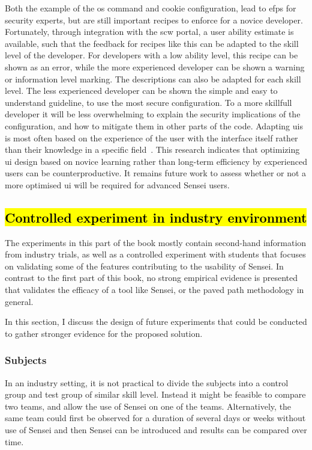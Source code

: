 Both the example of the \gls{os} command and cookie configuration, lead to \glspl{efp} for security experts, but are still important recipes to enforce for a novice developer.
Fortunately, through integration with the \gls{scw} portal, a user ability estimate is available, such that the feedback for recipes like this can be adapted to the skill level of the developer.
For developers with a low ability level, this recipe can be shown as an error, while the more experienced developer can be shown a warning or information level marking.
The descriptions can also be adapted for each skill level.
The less experienced developer can be shown the simple and easy to understand guideline, to use the most secure configuration.
To a more skillfull developer it will be less overwhelming to explain the security implications of the configuration, and how to mitigate them in other parts of the code.
Adapting \glspl{ui} is most often based on the experience of the user with the interface itself rather than their knowledge in a specific field~\cite{johnson2015bespoke, cockburn2014supporting}.
This research indicates that optimizing \gls{ui} design based on novice learning rather than long-term efficiency by experienced users can be counterproductive.
It remains future work to assess whether or not a more optimised \gls{ui} will be required for advanced Sensei users.

\subsection{\hl{Controlled experiment in industry environment}}

The experiments in this part of the book mostly contain second-hand information from industry trials, as well as a controlled experiment with students that focuses on validating some of the features contributing to the usability of Sensei.
In contrast to the first part of this book, no strong empirical evidence is presented that validates the efficacy of a tool like Sensei, or the paved path methodology in general.

In this section, I discuss the design of future experiments that could be conducted to gather stronger evidence for the proposed solution.

\subsubsection{Subjects}
In an industry setting, it is not practical to divide the subjects into a control group and test group of similar skill level.
Instead it might be feasible to compare two teams, and allow the use of Sensei on one of the teams.
Alternatively, the same team could first be observed for a duration of several days or weeks without use of Sensei and then Sensei can be introduced and results can be compared over time.

